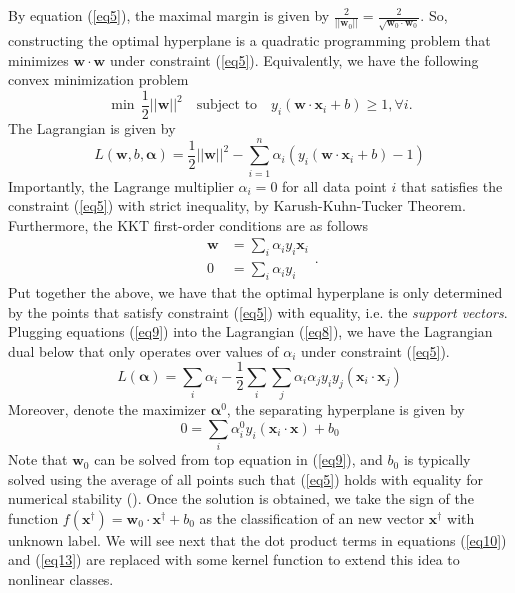 \documentclass[12pt]{article}
\theoremstyle{definition}
\begin{document}
By equation (\ref{eq5}), the maximal margin is given by $\frac{2}{||\mathbf{w}_0||}=\frac{2}{\sqrt{\mathbf{w}_0\cdot\mathbf{w}_0}}$. So, constructing the optimal hyperplane is a quadratic programming problem that minimizes $\mathbf{w}\cdot\mathbf{w}$ under constraint (\ref{eq5}). Equivalently, we have the following convex minimization problem
$$\min\,\frac{1}{2}||\mathbf{w}||^2\quad\text{subject to}\quad y_i(\mathbf{w}\cdot\mathbf{x}_i+b)\geq1, \forall i.$$
The Lagrangian is given by 
\begin{equation}\label{eq8}
    L(\mathbf{w},b,\bm{\alpha})=\frac{1}{2}||\mathbf{w}||^2-\sum_{i=1}^n \alpha_i(y_i(\mathbf{w}\cdot\mathbf{x}_i+b)-1)
\end{equation}
Importantly, the Lagrange multiplier $\alpha_i=0$ for all data point $i$ that satisfies the constraint (\ref{eq5}) with strict inequality, by Karush-Kuhn-Tucker Theorem. Furthermore, the KKT first-order conditions are as follows
\begin{equation}\label{eq9}
\begin{aligned}
\mathbf{w}&=\sum_i\alpha_i y_i\mathbf{x}_i\\
0&=\sum_i\alpha_i y_i
\end{aligned}.
\end{equation}
Put together the above, we have that the optimal hyperplane is only determined by the points that satisfy constraint (\ref{eq5}) with equality, i.e. the \textit{support vectors}. Plugging equations (\ref{eq9}) into the Lagrangian (\ref{eq8}), we have the Lagrangian dual below that only operates over values of $\alpha_i$ under constraint (\ref{eq5}).
\begin{equation}\label{eq10}
    L(\bm{\alpha})=\sum_i\alpha_i-\frac{1}{2}\sum_i\sum_j\alpha_i\alpha_j y_i y_j (\mathbf{x}_i\cdot\mathbf{x}_j)
\end{equation}
Moreover, denote the maximizer $\bm{\alpha}^0$, the separating hyperplane is given by
\begin{equation}\label{eq13}
    0=\sum_i\alpha_i^0 y_i (\mathbf{x}_i\cdot\mathbf{x}) + b_0
\end{equation}
Note that $\mathbf{w}_0$ can be solved from top equation in (\ref{eq9}), and $b_0$ is typically solved using the average of all points such that (\ref{eq5}) holds with equality for numerical stability (\cite{Elements}). Once the solution is obtained, we take the sign of the function $f(\mathbf{x}^\dagger)=\mathbf{w}_0\cdot\mathbf{x}^\dagger+b_0$ as the classification of an new vector $\mathbf{x}^\dagger$ with unknown label. We will see next that the dot product terms in equations (\ref{eq10}) and (\ref{eq13}) are replaced with some kernel function to extend this idea to nonlinear classes.
\end{document}
